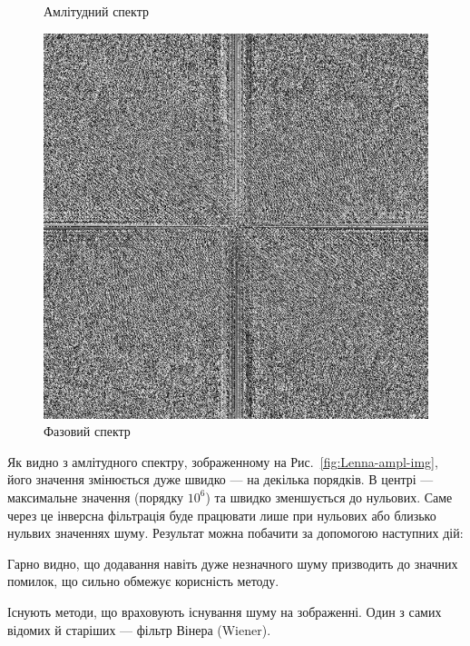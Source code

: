 \documentclass[simple,14pt,utf8,ukrainian]{eskdtext}
\begin{document}
\begin{figure}[!htb]
      \caption{Амлітудний спектр}\label{fig:Lenna-ampl-img}
    \endminipage\hfill
      \includegraphics[width=\linewidth]{Lenna-phase.png}
      \caption{Фазовий спектр}\label{fig:Lenna-phase-img}
    \endminipage\hfill
\end{figure}

Як видно з амлітудного спектру, зображенному на Рис.~\ref{fig:Lenna-ampl-img},
його значення змінюється дуже швидко --- на декілька порядків.
В центрі --- максимальне значення (порядку $10^6$) та швидко зменшується до
нульових.
Саме через це інверсна фільтрація буде працювати лише при нульових або близько
нульвих значеннях шуму.
Результат можна побачити за допомогою наступних дій:

Гарно видно, що додавання навіть дуже незначного шуму призводить до значних
помилок, що сильно обмежує корисність методу.

Існують методи, що враховують існування шуму на зображенні.
Один з самих відомих й старіших --- фільтр Вінера (Wiener).





\end{document}
